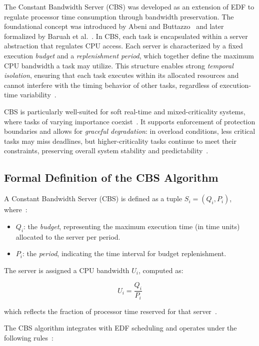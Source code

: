 \documentclass[conference]{IEEEtran}
\begin{document}
The Constant Bandwidth Server (CBS) was developed as an extension of EDF to regulate processor time consumption through bandwidth preservation. The foundational concept was introduced by Abeni and Buttazzo~\cite{abeni1998integrating} and later formalized by Baruah et al.~\cite{baruah2004dynamic}. In CBS, each task is encapsulated within a server abstraction that regulates CPU access. Each server is characterized by a fixed execution \textit{budget} and a \textit{replenishment period}, which together define the maximum CPU bandwidth a task may utilize. This structure enables strong \textit{temporal isolation}, ensuring that each task executes within its allocated resources and cannot interfere with the timing behavior of other tasks, regardless of execution-time variability~\cite{buttazzo2011hard}.

CBS is particularly well-suited for soft real-time and mixed-criticality systems, where tasks of varying importance coexist~\cite{baruah2004dynamic}. It supports enforcement of protection boundaries and allows for \textit{graceful degradation}: in overload conditions, less critical tasks may miss deadlines, but higher-criticality tasks continue to meet their constraints, preserving overall system stability and predictability~\cite{buttazzo2011hard}.

\subsection{Formal Definition of the CBS Algorithm}

A Constant Bandwidth Server (CBS) is defined as a tuple \( S_i = (Q_i, P_i) \), where~\cite{abeni1998integrating}:
\begin{itemize}
    \item \( Q_i \): the \textit{budget}, representing the maximum execution time (in time units) allocated to the server per period.
    \item \( P_i \): the \textit{period}, indicating the time interval for budget replenishment.
\end{itemize}

The server is assigned a CPU bandwidth \( U_i \), computed as:

\[
U_i = \frac{Q_i}{P_i}
\]

which reflects the fraction of processor time reserved for that server~\cite{buttazzo2011hard}.

The CBS algorithm integrates with EDF scheduling and operates under the following rules~\cite{baruah2004dynamic}:
\end{document}
